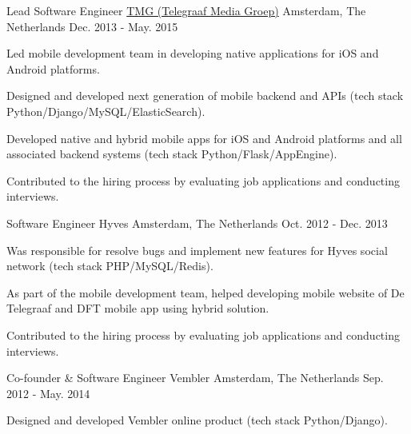 \begin{cventries}
  \cventry
    {Lead Software Engineer} %
    {\href{https://www.tmg.nl/nl}{TMG (Telegraaf Media Groep)}} %
    {Amsterdam, The Netherlands} %
    {Dec. 2013 - May. 2015} %
    {
      \begin{cvitems} %
        \item {Led mobile development team in developing native applications for iOS and Android platforms.}
        \item {Designed and developed next generation of mobile backend and APIs (tech stack Python/Django/MySQL/ElasticSearch).}
        \item {Developed native and hybrid mobile apps for iOS and Android platforms and all associated backend systems (tech stack Python/Flask/AppEngine).}
        \item {Contributed to the hiring process by evaluating job applications and conducting interviews.}
      \end{cvitems}
    }

  \cventry
    {Software Engineer} %
    {Hyves} %
    {Amsterdam, The Netherlands} %
    {Oct. 2012 - Dec. 2013} %
    {
      \begin{cvitems} %
        \item {Was responsible for resolve bugs and implement new features for Hyves social network (tech stack PHP/MySQL/Redis).}
        \item {As part of the mobile development team, helped developing mobile website of De Telegraaf and DFT mobile app using hybrid solution.}
        \item {Contributed to the hiring process by evaluating job applications and conducting interviews.}
      \end{cvitems}
    }

  \cventry
    {Co-founder \& Software Engineer} %
    {Vembler} %
    {Amsterdam, The Netherlands} %
    {Sep. 2012 - May. 2014} %
    {
      \begin{cvitems} %
        \item {Designed and developed Vembler online product (tech stack Python/Django).}
      \end{cvitems}
    }


\end{cventries}
